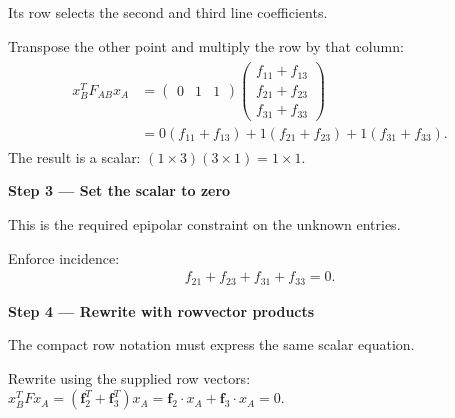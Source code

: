 \documentclass[letterpaper,11pt,english,openany,oneside]{jupyterBook}
\begin{document}
\sphinxAtStartPar
{} Its row selects the second and third line coefficients.

\sphinxAtStartPar
Transpose the other point and multiply the row by that column:
{\color{QuizMathBlue} \begin{equation*}
\begin{split}
\begin{aligned}
x_B^TF_{AB}x_A
&=\begin{pmatrix}0&1&1\end{pmatrix}\begin{pmatrix}f_{11}+f_{13}\\f_{21}+f_{23}\\f_{31}+f_{33}\end{pmatrix}\\
&=0(f_{11}+f_{13})+1(f_{21}+f_{23})+1(f_{31}+f_{33}).
\end{aligned}
\end{split}
\end{equation*}}
\sphinxAtStartPar
The result is a scalar: {\color{QuizMathBlue} \((1\times3)(3\times1)=1\times1\)}.

\par

\par\medskip{}
{\color{QuizStepRed}\bfseries Step 3 — Set the scalar to zero}\par\smallskip

\sphinxAtStartPar
{} This is the required epipolar constraint on the unknown entries.

\sphinxAtStartPar
Enforce incidence:
{\color{QuizMathBlue} \begin{equation*}
\begin{split}
\boxed{f_{21}+f_{23}+f_{31}+f_{33}=0}.
\end{split}
\end{equation*}}
\par

\par\medskip{}
{\color{QuizStepRed}\bfseries Step 4 — Rewrite with row\sphinxhyphen{}vector products}\par\smallskip

\sphinxAtStartPar
{} The compact row notation must express the same scalar equation.

\sphinxAtStartPar
Rewrite using the supplied row vectors: {\color{QuizMathBlue} \(x_B^TFx_A=(\mathbf f_2^T+\mathbf f_3^T)x_A=\mathbf f_2\cdot x_A+\mathbf f_3\cdot x_A=0\)}.
\end{document}
